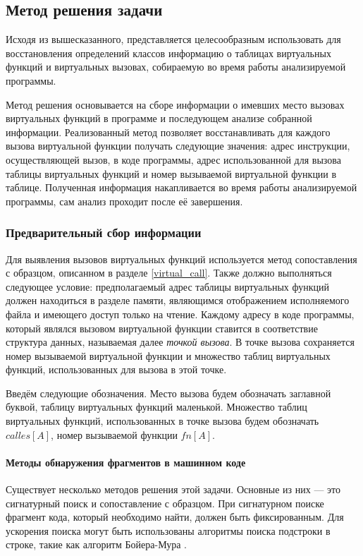 \documentclass[a4paper,12pt,russian]{article}
\begin{document}
\subsection{Метод решения задачи}
Исходя из вышесказанного, представляется целесообразным использовать для восстановления определений классов информацию о таблицах виртуальных функций и виртуальных вызовах, собираемую во время работы анализируемой программы.

Метод решения основывается на сборе информации о имевших место вызовах виртуальных функций в программе и последующем анализе собранной информации.
Реализованный метод позволяет восстанавливать для каждого вызова виртуальной функции получать следующие значения: адрес инструкции, осуществляющей вызов, в коде программы, адрес использованной для вызова таблицы виртуальных функций и номер вызываемой виртуальной функции в таблице.
Полученная информация накапливается во время работы анализируемой программы, сам анализ проходит после её завершения.

\subsubsection{Предварительный сбор информации}
Для выявления вызовов виртуальных функций используется метод сопоставления с образцом, описанном в разделе \ref{virtual_call}.
Также должно выполняться следующее условие: предполагаемый адрес таблицы виртуальных функций должен находиться в разделе памяти, являющимся отображением исполняемого файла и имеющего доступ только на чтение.
Каждому адресу в коде программы, который являлся вызовом виртуальной функции ставится в соответствие структура данных, называемая далее \emph{точкой вызова}.
В точке вызова сохраняется номер вызываемой виртуальной функции и множество таблиц виртуальных функций, использованных для вызова в этой точке.

Введём следующие обозначения.
Место вызова будем обозначать заглавной буквой, таблицу виртуальных функций маленькой.
Множество таблиц виртуальных функций, использованных в точке вызова будем обозначать $calles[A]$, номер вызываемой функции $fn[A]$.
\paragraph{Методы обнаружения фрагментов в машинном коде}
Существует несколько методов решения этой задачи.
Основные из них --- это сигнатурный поиск и сопоставление с образцом.
При сигнатурном поиске фрагмент кода, который необходимо найти, должен быть фиксированным.
Для ускорения поиска могут быть использованы алгоритмы поиска подстроки в строке, такие как алгоритм Бойера-Мура \cite{corman}.
\end{document}

